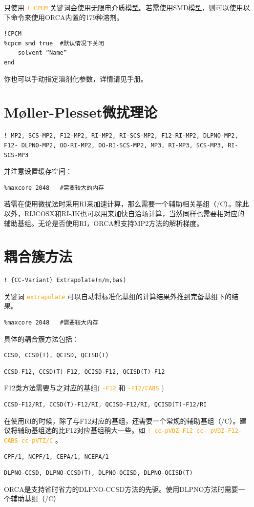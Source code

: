 \documentclass{ctexart}
\newcommand{\cmd}[1]{ \textcolor{orange}{\texttt{#1}} }
\begin{document}
	只使用\cmd{! CPCM}关键词会使用无限电介质模型。若需使用SMD模型，则可以使用以下命令来使用ORCA内置的179种溶剂。
	
	\begin{lstlisting}
!CPCM	
%cpcm smd true	#默认情况下关闭
	solvent “Name”
end
	\end{lstlisting}
	
	你也可以手动指定溶剂化参数，详情请见手册。
	
	\section{Møller-Plesset微扰理论} 
	\begin{lstlisting}
! MP2, SCS-MP2, F12-MP2, RI-MP2, RI-SCS-MP2, F12-RI-MP2, DLPNO-MP2, F12- DLPNO-MP2, OO-RI-MP2, OO-RI-SCS-MP2, MP3, RI-MP3, SCS-MP3, RI-SCS-MP3
	\end{lstlisting}
	
	并注意设置缓存空间：
	\begin{lstlisting}
%maxcore 2048	#需要较大的内存
	\end{lstlisting}
	
	若需在使用微扰法时采用RI来加速计算，那么需要一个辅助相关基组（/C）。除此以外，RIJCOSX和RI-JK也可以用来加快自洽场计算，当然同样也需要相对应的辅助基组。无论是否使用RI，ORCA都支持MP2方法的解析梯度。
	
	\section{耦合簇方法} 
	\begin{lstlisting}
! {CC-Variant} Extrapolate(n/m,bas)
	\end{lstlisting}
	
	关键词\cmd{extrapolate}可以自动将标准化基组的计算结果外推到完备基组下的结果。
	
	\begin{lstlisting}
%maxcore 2048	#需要较大内存
	\end{lstlisting}
	
	具体的耦合簇方法包括：
	\begin{lstlisting}
CCSD, CCSD(T), QCISD, QCISD(T)
	\end{lstlisting}
	
	\begin{lstlisting}
CCSD-F12, CCSD(T)-F12, QCISD-F12, QCISD(T)-F12
	\end{lstlisting}
	
	F12类方法需要与之对应的基组(\cmd{-F12}和\cmd{-F12/CABS})
	\begin{lstlisting}
CCSD-F12/RI, CCSD(T)-F12/RI, QCISD-F12/RI, QCISD(T)-F12/RI
	\end{lstlisting}
	在使用RI的时候，除了与F12对应的基组，还需要一个常规的辅助基组（/C）。建议将辅助基组选的比F12对应基组稍大一些。如\cmd{! cc-pVDZ-F12 cc- pVDZ-F12-CABS cc-pVTZ/C}。
	\begin{lstlisting}
CPF/1, NCPF/1, CEPA/1, NCEPA/1
	\end{lstlisting}
	\begin{lstlisting}
DLPNO-CCSD, DLPNO-CCSD(T), DLPNO-QCISD, DLPNO-QCISD(T)
	\end{lstlisting}
	ORCA是支持省时省力的DLPNO-CCSD方法的先驱。使用DLPNO方法时需要一个辅助基组（/C）
	
\end{document}
